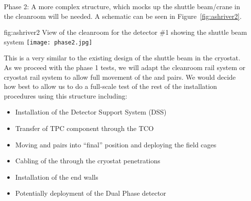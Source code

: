 Phase 2: A more complex structure, which mocks up the shuttle
beam/crane in the cleanroom will be needed. A schematic can be seen in
Figure~\ref{fig:ashriver2}.
\begin{dunefigure}{fig:ashriver2}
  {View of the cleanroom for the  detector \#1 showing the shuttle beam system}
  \texttt{[image: phase2.jpg]}
\end{dunefigure}
This is a very similar to the existing
design of the shuttle beam in the cryostat.  As we proceed with the
phase 1 tests, we will adapt the cleanroom rail system or cryostat
rail system to allow full movement of the  and  pairs. We would
decide how best to allow us to do a full-scale test of the rest of the
installation procedures using this structure including:
\begin{itemize}
 \item Installation of the Detector Support System (DSS)
 \item Transfer of TPC component through the TCO
 \item Moving  and  pairs into ``final'' position and deploying the field cages
 \item Cabling of the  through the cryostat penetrations
 \item Installation of the end walls
 \item Potentially deployment of the Dual Phase detector
\end{itemize}
